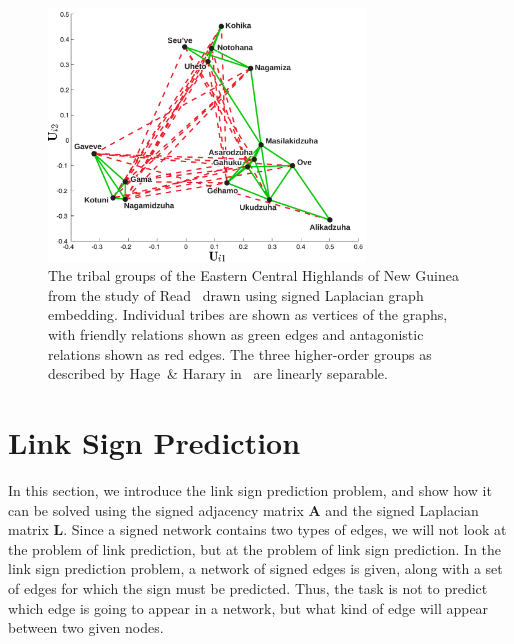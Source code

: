 \documentclass[11pt,a4paper]{book}
\newcommand{\wOnePointFive}{0.75}
\begin{document}
\begin{figure}[h!]
  \centering
  \includegraphics[width=\wOnePointFive\textwidth]{img-svg/gama} 
  \caption{
    The tribal groups of the Eastern Central Highlands of New Guinea
    from the study of Read~\cite{b322} drawn using signed Laplacian graph embedding. 
    Individual tribes are shown as vertices of the graphs, with friendly
    relations shown as green edges and antagonistic relations shown as
    red edges.  
    The three higher-order groups as described by Hage~\& Harary in~\cite{b323} are
    linearly separable. 
  }
  \label{fig:gama}
\end{figure}


\section{Link Sign Prediction}
\label{sec:signed:kernel}
In this section, we introduce the link sign prediction problem, and show how
it can be solved using the signed
adjacency matrix $\mathbf A$ and the signed Laplacian matrix $\mathbf
L$.  
Since a signed network contains two types of edges, we will not look at
the problem of link prediction, but at the problem of link sign
prediction.  In the link sign prediction problem, a network of signed
edges is given, along with a set of edges for which the sign must be
predicted.  Thus, the task is not to predict which edge is going to
appear in a network, but what kind of edge will appear between two given
nodes.  
\end{document}
